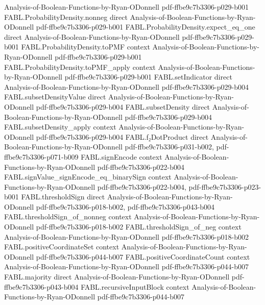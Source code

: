 \begin{theorem}
  {Analysis-of-Boolean-Functions-by-Ryan-ODonnell}
  {pdf-ffbe9c7b3306-p029-b001}
\proofstep
  {FABL.ProbabilityDensity.nonneg}
  {direct}
  {Analysis-of-Boolean-Functions-by-Ryan-ODonnell}
  {pdf-ffbe9c7b3306-p029-b001}
\proofstep
  {FABL.ProbabilityDensity.expect_eq_one}
  {direct}
  {Analysis-of-Boolean-Functions-by-Ryan-ODonnell}
  {pdf-ffbe9c7b3306-p029-b001}
\proofstep
  {FABL.ProbabilityDensity.toPMF}
  {context}
  {Analysis-of-Boolean-Functions-by-Ryan-ODonnell}
  {pdf-ffbe9c7b3306-p029-b001}
\proofstep
  {FABL.ProbabilityDensity.toPMF_apply}
  {context}
  {Analysis-of-Boolean-Functions-by-Ryan-ODonnell}
  {pdf-ffbe9c7b3306-p029-b001}
\proofstep
  {FABL.setIndicator}
  {direct}
  {Analysis-of-Boolean-Functions-by-Ryan-ODonnell}
  {pdf-ffbe9c7b3306-p029-b004}
\proofstep
  {FABL.subsetDensityValue}
  {direct}
  {Analysis-of-Boolean-Functions-by-Ryan-ODonnell}
  {pdf-ffbe9c7b3306-p029-b004}
\proofstep
  {FABL.subsetDensity}
  {direct}
  {Analysis-of-Boolean-Functions-by-Ryan-ODonnell}
  {pdf-ffbe9c7b3306-p029-b004}
\proofstep
  {FABL.subsetDensity_apply}
  {context}
  {Analysis-of-Boolean-Functions-by-Ryan-ODonnell}
  {pdf-ffbe9c7b3306-p029-b004}
\proofstep
  {FABL.f₂DotProduct}
  {direct}
  {Analysis-of-Boolean-Functions-by-Ryan-ODonnell}
  {pdf-ffbe9c7b3306-p031-b002,
    pdf-ffbe9c7b3306-p071-b009}
\proofstep
  {FABL.signEncode}
  {context}
  {Analysis-of-Boolean-Functions-by-Ryan-ODonnell}
  {pdf-ffbe9c7b3306-p022-b004}
\proofstep
  {FABL.signValue_signEncode_eq_binarySign}
  {context}
  {Analysis-of-Boolean-Functions-by-Ryan-ODonnell}
  {pdf-ffbe9c7b3306-p022-b004,
    pdf-ffbe9c7b3306-p023-b001}
\proofstep
  {FABL.thresholdSign}
  {direct}
  {Analysis-of-Boolean-Functions-by-Ryan-ODonnell}
  {pdf-ffbe9c7b3306-p018-b002,
    pdf-ffbe9c7b3306-p043-b004}
\proofstep
  {FABL.thresholdSign_of_nonneg}
  {context}
  {Analysis-of-Boolean-Functions-by-Ryan-ODonnell}
  {pdf-ffbe9c7b3306-p018-b002}
\proofstep
  {FABL.thresholdSign_of_neg}
  {context}
  {Analysis-of-Boolean-Functions-by-Ryan-ODonnell}
  {pdf-ffbe9c7b3306-p018-b002}
\proofstep
  {FABL.positiveCoordinateSet}
  {context}
  {Analysis-of-Boolean-Functions-by-Ryan-ODonnell}
  {pdf-ffbe9c7b3306-p044-b007}
\proofstep
  {FABL.positiveCoordinateCount}
  {context}
  {Analysis-of-Boolean-Functions-by-Ryan-ODonnell}
  {pdf-ffbe9c7b3306-p044-b007}
\proofstep
  {FABL.majority}
  {direct}
  {Analysis-of-Boolean-Functions-by-Ryan-ODonnell}
  {pdf-ffbe9c7b3306-p043-b004}
\proofstep
  {FABL.recursiveInputBlock}
  {context}
  {Analysis-of-Boolean-Functions-by-Ryan-ODonnell}
  {pdf-ffbe9c7b3306-p044-b007}
\proofstep

\end{theorem}

